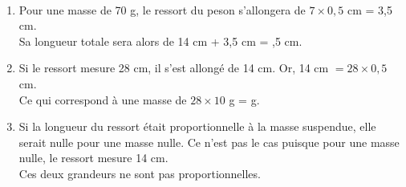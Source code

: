 \ \\ [-5mm]
   \begin{enumerate}
      \item Pour une masse de 70 g, le ressort du peson s'allongera de $7\times0,5$ cm = 3,5 cm. \\
         Sa longueur totale sera alors de 14 cm + 3,5 cm = {,5 cm.}
      \item Si le ressort mesure 28 cm, il s'est allongé de 14 cm. Or, 14 cm $=28\times0,5$ cm. \\
         Ce qui correspond à une masse de  $28\times10$ g = { g.}
      \item Si la longueur du ressort était proportionnelle à la masse suspendue, elle serait nulle pour une masse nulle. Ce n'est pas le cas puisque pour une masse nulle, le ressort mesure 14 cm. \\
         {\blue Ces deux grandeurs ne sont pas proportionnelles.}
   \end{enumerate}
